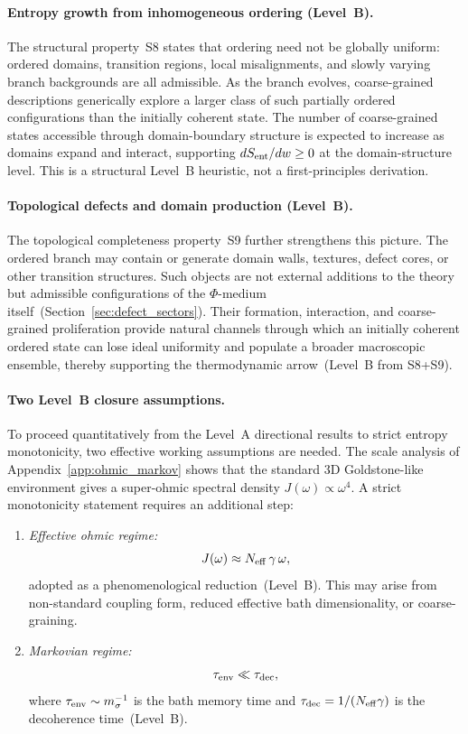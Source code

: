 \documentclass[11pt,a4paper]{article}
\numberwithin{equation}{section}
\begin{document}
\paragraph{Entropy growth from inhomogeneous ordering (Level~B).}
The structural property~S8 states that ordering need not be globally
uniform: ordered domains, transition regions, local misalignments, and
slowly varying branch backgrounds are all admissible.
As the branch evolves, coarse-grained descriptions generically explore
a larger class of such partially ordered configurations than the
initially coherent state.
The number of coarse-grained states accessible through
domain-boundary structure is expected to increase as domains expand
and interact, supporting $dS_{\rm ent}/dw\geq 0$ at the
domain-structure level.
This is a structural Level~B heuristic, not a first-principles
derivation.

\paragraph{Topological defects and domain production (Level~B).}
The topological completeness property~S9 further strengthens this
picture.
The ordered branch may contain or generate domain walls, textures,
defect cores, or other transition structures.
Such objects are not external additions to the theory but admissible
configurations of the $\Phi$-medium
itself~(Section~\ref{sec:defect_sectors}).
Their formation, interaction, and coarse-grained proliferation provide
natural channels through which an initially coherent ordered state can
lose ideal uniformity and populate a broader macroscopic ensemble,
thereby supporting the thermodynamic arrow~(Level~B from S8+S9).

\paragraph{Two Level~B closure assumptions.}
To proceed quantitatively from the Level~A directional
results to strict entropy monotonicity, two effective working
assumptions are needed.
The scale analysis of Appendix~\ref{app:ohmic_markov} shows that
the standard 3D Goldstone-like environment gives a super-ohmic spectral
density $J(\omega)\propto\omega^4$.
A strict monotonicity statement requires an additional step:
\begin{enumerate}[label=(\roman*)]
  \item \emph{Effective ohmic regime:}
    \begin{equation}
      J(\omega) \approx N_{\rm eff}\,\gamma\,\omega,
      \label{eq:ohmic_3p9}
    \end{equation}
    adopted as a phenomenological reduction~(Level~B).
    This may arise from non-standard coupling form, reduced effective
    bath dimensionality, or coarse-graining.
  \item \emph{Markovian regime:}
    \begin{equation}
      \tau_{\rm env} \ll \tau_{\rm dec},
      \label{eq:markov_3p9}
    \end{equation}
    where $\tau_{\rm env}\sim m_\sigma^{-1}$ is the bath memory time
    and $\tau_{\rm dec} = 1/(N_{\rm eff}\gamma)$ is the decoherence
    time~(Level~B).
\end{enumerate}
\end{document}
